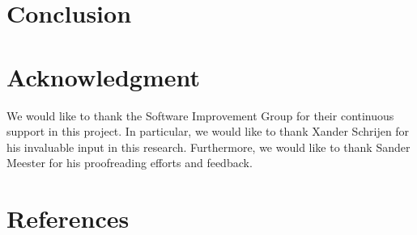 \documentclass[sigconf,review]{acmart}
\begin{document}
\section{Conclusion}

\section*{Acknowledgment}
We would like to thank the Software Improvement Group for their continuous support in this project. In particular, we would like to thank Xander Schrijen for his invaluable input in this research. Furthermore, we would like to thank Sander Meester for his proofreading efforts and feedback.

\section*{References}



\end{document}

